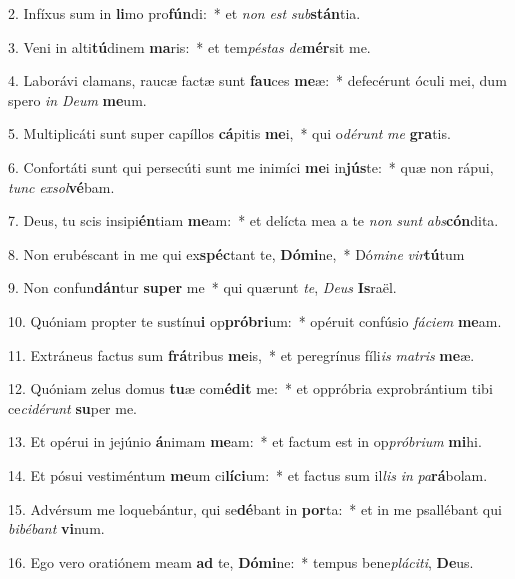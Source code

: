 2. Infíxus sum in \textbf{li}mo pro\textbf{fún}di:~*  et \textit{non} \textit{est} \textit{sub}\textbf{stán}tia.\

3. Veni in alti\textbf{tú}dinem \textbf{ma}ris:~*  et tem\textit{pés}\textit{tas} \textit{de}\textbf{mér}sit me.\

4. Laborávi clamans, raucæ factæ sunt \textbf{fau}ces \textbf{me}æ:~*  defecérunt óculi mei, dum spero \textit{in} \textit{De}\textit{um} \textbf{me}um.\

5. Multiplicáti sunt super capíllos \textbf{cá}pitis \textbf{me}i,~*  qui o\textit{dé}\textit{runt} \textit{me} \textbf{gra}tis.\

6. Confortáti sunt qui persecúti sunt me inimíci \textbf{me}i in\textbf{jús}te:~*  quæ non rápui, \textit{tunc} \textit{ex}\textit{sol}\textbf{vé}bam.\

7. Deus, tu scis insipi\textbf{én}tiam \textbf{me}am:~*  et delícta mea a te \textit{non} \textit{sunt} \textit{abs}\textbf{cón}dita.\

8. Non erubéscant in me qui ex\textbf{spéc}tant te, \textbf{Dó}\textbf{mi}ne,~*  Dó\textit{mi}\textit{ne} \textit{vir}\textbf{tú}tum\

9. Non confun\textbf{dán}tur \textbf{su}\textbf{per} me~*  qui quærunt \textit{te}, \textit{De}\textit{us} \textbf{Is}raël.\

10. Quóniam propter te sustínu\textbf{i} op\textbf{pró}\textbf{bri}um:~*  opéruit confúsio \textit{fá}\textit{ci}\textit{em} \textbf{me}am.\

11. Extráneus factus sum \textbf{frá}tribus \textbf{me}is,~*  et peregrínus fíli\textit{is} \textit{ma}\textit{tris} \textbf{me}æ.\

12. Quóniam zelus domus \textbf{tu}æ com\textbf{é}\textbf{dit} me:~*  et oppróbria exprobrántium tibi ce\textit{ci}\textit{dé}\textit{runt} \textbf{su}per me.\

13. Et opérui in jejúnio \textbf{á}nimam \textbf{me}am:~*  et factum est in op\textit{pró}\textit{bri}\textit{um} \textbf{mi}hi.\

14. Et pósui vestiméntum \textbf{me}um ci\textbf{lí}\textbf{ci}um:~*  et factus sum il\textit{lis} \textit{in} \textit{pa}\textbf{rá}bolam.\

15. Advérsum me loquebántur, qui se\textbf{dé}bant in \textbf{por}ta:~*  et in me psallébant qui \textit{bi}\textit{bé}\textit{bant} \textbf{vi}num.\

16. Ego vero oratiónem meam \textbf{ad} te, \textbf{Dó}\textbf{mi}ne:~*  tempus bene\textit{plá}\textit{ci}\textit{ti}, \textbf{De}us.\

